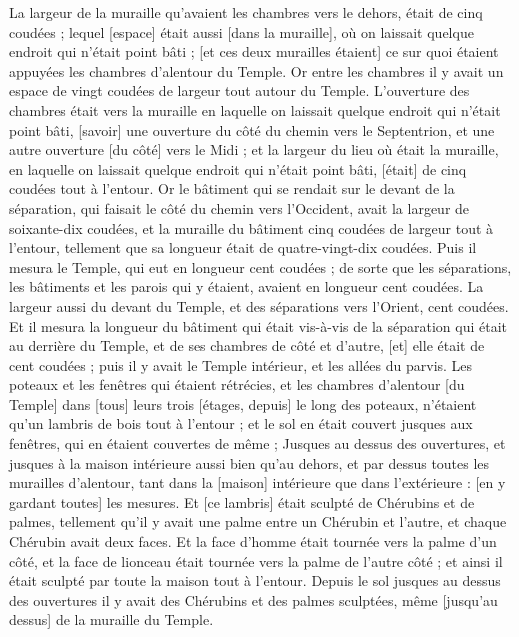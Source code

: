\begin{multicols}{2}
La largeur de la muraille qu'avaient les chambres vers le dehors, était de cinq coudées ; lequel [espace] était aussi [dans la muraille], où on laissait quelque endroit qui n'était point bâti ; [et ces deux murailles étaient] ce sur quoi étaient appuyées les chambres d'alentour du Temple.
Or entre les chambres il y avait un espace de vingt coudées de largeur tout autour du Temple.
L'ouverture des chambres était vers la muraille en laquelle on laissait quelque endroit qui n'était point bâti, [savoir] une ouverture du côté du chemin vers le Septentrion, et une autre ouverture [du côté] vers le Midi ; et la largeur du lieu où était la muraille, en laquelle on laissait quelque endroit qui n'était point bâti, [était] de cinq coudées tout à l'entour.
Or le bâtiment qui se rendait sur le devant de la séparation, qui faisait le côté du chemin vers l'Occident, avait la largeur de soixante-dix coudées, et la muraille du bâtiment cinq coudées de largeur tout à l'entour, tellement que sa longueur était de quatre-vingt-dix coudées.
Puis il mesura le Temple, qui eut en longueur cent coudées ; de sorte que les séparations, les bâtiments et les parois qui y étaient, avaient en longueur cent coudées.
La largeur aussi du devant du Temple, et des séparations vers l'Orient, cent coudées.
Et il mesura la longueur du bâtiment qui était vis-à-vis de la séparation qui était au derrière du Temple, et de ses chambres de côté et d'autre, [et] elle était de cent coudées ; puis il y avait le Temple intérieur, et les allées du parvis.
Les poteaux et les fenêtres qui étaient rétrécies, et les chambres d'alentour [du Temple] dans [tous] leurs trois [étages, depuis] le long des poteaux, n'étaient qu'un lambris de bois tout à l'entour ; et le sol en était couvert jusques aux fenêtres, qui en étaient couvertes de même ;
Jusques au dessus des ouvertures, et jusques à la maison intérieure aussi bien qu'au dehors, et par dessus toutes les murailles d'alentour, tant dans la [maison] intérieure que dans l'extérieure : [en y gardant toutes] les mesures.
Et [ce lambris] était sculpté de Chérubins et de palmes, tellement qu'il y avait une palme entre un Chérubin et l'autre, et chaque Chérubin avait deux faces.
Et la face d'homme était tournée vers la palme d'un côté, et la face de lionceau était tournée vers la palme de l'autre côté ; et ainsi il était sculpté par toute la maison tout à l'entour.
Depuis le sol jusques au dessus des ouvertures il y avait des Chérubins et des palmes sculptées, même [jusqu'au dessus] de la muraille du Temple.

\end{multicols}
